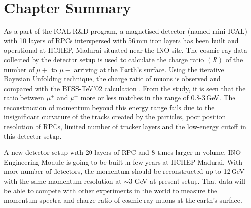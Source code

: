 \section{Chapter Summary}
As a part of the ICAL R\&D program, a magnetised detector
(named mini-ICAL) with 10 layers of RPCs interspersed with 56\,mm iron
layers has been built and operational at IICHEP, Madurai situated
near the INO site. The cosmic ray data collected by the detector
setup is used to calculate the charge ratio $(R)$ of the number
of $\mu+$ to $\mu-$ arriving at the Earth's surface.
Using the iterative Bayesian Unfolding technique, the charge ratio
of muons is observed and compared with the BESS-TeV'02 calculation
\cite{bess2002}.
From the study, it is seen that the ratio between $\mu^{+}$ and
$\mu^{-}$ more or less matches in the range of 0.8-3\,GeV.
The reconstruction of momentum beyond this energy range fails due to the
insignificant curvature of the tracks created by the particles, poor
position resolution of RPCs, limited number of tracker layers and
the low-energy cutoff in this detector setup.

A new detector setup with 20 layers of RPC and 8 times larger in volume,
INO Engineering Module is going to be built in few years at IICHEP
Madurai. With more number of detectors, the momentum should be
reconstructed up-to 12\,GeV with the same momentum resolution at
$\sim$3 GeV at present setup. That data will be able to compete
with other experiments in the world to measure the momentum spectra
and charge ratio of cosmic ray muons at the earth's surface.
